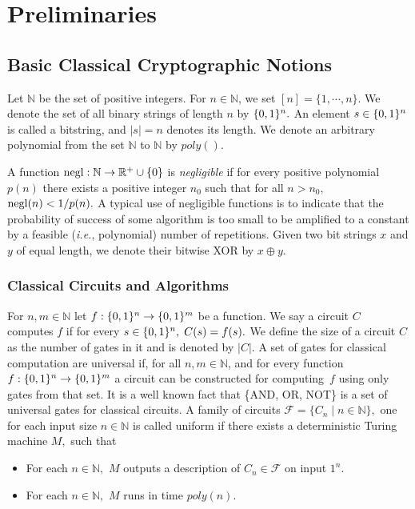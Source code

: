 \section{Preliminaries}
\subsection{Basic Classical Cryptographic Notions}
\label{sec:classical-prelims}
Let $\mathbb{N}$ be the set of positive integers. For $n \in \mathbb{N}$, we set $[n] = \{1, \cdots, n\}.$ We denote the set of all  binary strings of length $n$ by $\{0,1\}^{n}.$
 An element $s \in \{0,1\}^{n}$ is called a bitstring, and $|s|=n$ denotes its length. We denote an arbitrary polynomial from the set $\mathbb{N}$ to $\mathbb{N}$ by $poly( ).$


A function ${\rm negl}:\mathbb{N}\rightarrow\mathbb{R}^{+}\cup \{0\}$ is \emph{negligible} if for every positive polynomial $p(n)$ there exists a positive integer $n_0$ such that  for all  $n>n_0,$ ${\rm negl}(n) < 1/ p(n).$   A typical use of negligible functions is to indicate that the probability of success of some algorithm is too small to be amplified to a constant by a feasible (\emph{i.e.}, polynomial) number of repetitions. Given two bit strings $x$ and $y$ of equal length, we denote their bitwise XOR by $x \oplus y.$

\subsubsection{Classical Circuits and Algorithms}
 For $n, m\in\mathbb{N}$ let  $f:\{0,1\}^{n}\rightarrow \{0,1\}^{m}$ be a function. We say a circuit $C$ computes $f$ if for every $s \in \{0,1\}^{n},\; C(s)=f(s).$  We define the size of a circuit $C$ as the number of gates in it and is denoted by $|C|.$ A set of gates for classical computation  are universal if, for all $n, m\in\mathbb{N}$, and for every function $f:\{0,1\}^{n}\rightarrow \{0,1\}^{m}$ a circuit can be constructed for computing~$f$ using only gates from that set. It is a well known fact that \{AND, OR, NOT\} is a set of universal gates for classical circuits. A family of circuits $\mathcal{F}=\{C_n\mid n\in\mathbb{N}\},$ one for each input  size $n\in \mathbb{N}$ is called uniform if there exists a deterministic Turing machine $M,$ such that
 \begin{itemize}
 \item For each $n\in\mathbb{N},$ $M$ outputs a description of $C_n \in \mathcal{F}$ on input $1^n.$
 \item  For each $n\in\mathbb{N},$ $M$ runs in time $poly(n).$
 \end{itemize}


